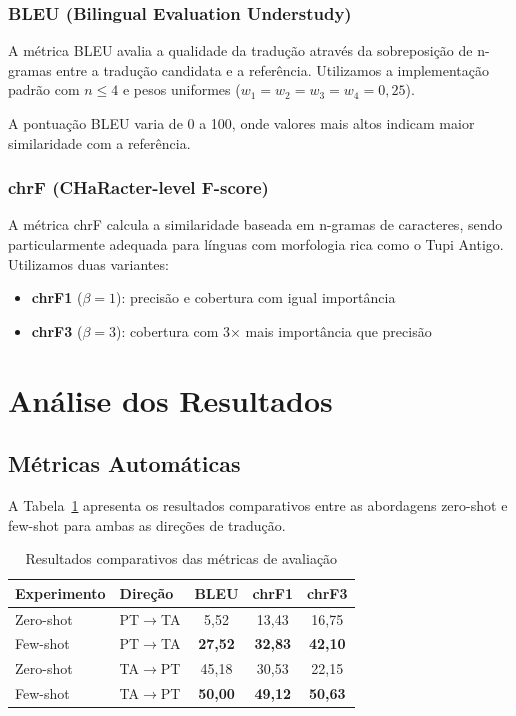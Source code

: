 \documentclass[12pt,a4paper]{article}
\begin{document}
\subsubsection{BLEU (Bilingual Evaluation Understudy)}

A métrica BLEU avalia a qualidade da tradução através da sobreposição de n-gramas entre a tradução candidata e a referência. Utilizamos a implementação padrão com $n \leq 4$ e pesos uniformes ($w_1 = w_2 = w_3 = w_4 = 0,25$).

A pontuação BLEU varia de 0 a 100, onde valores mais altos indicam maior similaridade com a referência.

\subsubsection{chrF (CHaRacter-level F-score)}

A métrica chrF calcula a similaridade baseada em n-gramas de caracteres, sendo particularmente adequada para línguas com morfologia rica como o Tupi Antigo. Utilizamos duas variantes:

\begin{itemize}
    \item \textbf{chrF1} ($\beta = 1$): precisão e cobertura com igual importância
    \item \textbf{chrF3} ($\beta = 3$): cobertura com 3× mais importância que precisão
\end{itemize}

\section{Análise dos Resultados}

\subsection{Métricas Automáticas}

A Tabela~\ref{tab:results} apresenta os resultados comparativos entre as abordagens zero-shot e few-shot para ambas as direções de tradução.

\begin{table}[H]
\centering
\caption{Resultados comparativos das métricas de avaliação}
\begin{tabular}{llccc}
\toprule
\textbf{Experimento} & \textbf{Direção} & \textbf{BLEU} & \textbf{chrF1} & \textbf{chrF3} \\
\midrule
Zero-shot & PT$\rightarrow$TA & 5,52 & 13,43 & 16,75 \\
Few-shot & PT$\rightarrow$TA & \textbf{27,52} & \textbf{32,83} & \textbf{42,10} \\
\midrule
Zero-shot & TA$\rightarrow$PT & 45,18 & 30,53 & 22,15 \\
Few-shot & TA$\rightarrow$PT & \textbf{50,00} & \textbf{49,12} & \textbf{50,63} \\
\bottomrule
\end{tabular}
\label{tab:results}
\end{table}
\end{document}
